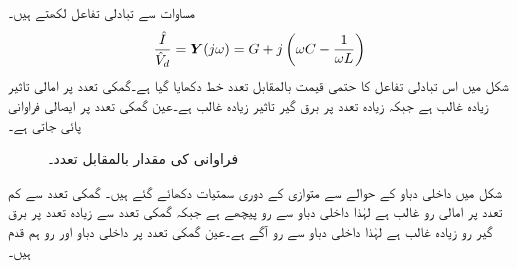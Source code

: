 مساوات  سے تبادلی تفاعل  لکھتے ہیں۔
\begin{align}
\frac{\hat{I}}{\hat{V}_d}={{\boldsymbol{Y}}}(j\omega)=G+j\left(\omega C-\frac{1}{\omega L}\right)
\end{align}
شکل  میں اس تبادلی تفاعل کا حتمی قیمت بالمقابل تعدد خط دکھایا گیا ہے۔گمکی تعدد پر امالی تاثیر زیادہ غالب ہے جبکہ زیادہ تعدد پر برق گیر تاثیر زیادہ غالب ہے۔عین گمکی تعدد پر ایصالی فراوانی پائی جاتی ہے۔
\begin{figure}
\centering
{}
\caption{فراوانی کی مقدار بالمقابل تعدد۔}
\label{شکل_تعددی_فراوانی_بالمقابل_تعدد}
\end{figure}
شکل  میں داخلی دباو  کے حوالے سے متوازی  کے دوری سمتیات دکھائے گئے ہیں۔ گمکی تعدد سے کم تعدد پر امالی رو غالب ہے لہٰذا داخلی دباو سے رو پیچھے ہے جبکہ گمکی تعدد سے زیادہ تعدد پر برق گیر رو زیادہ غالب ہے لہٰذا داخلی دباو سے رو آگے ہے۔عین گمکی تعدد پر داخلی دباو اور رو ہم قدم ہیں۔

